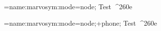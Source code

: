 \documentclass{article}
\begin{document}
\font\test={name:marvosym:mode=node;}
Test {\test ^^^^260e}

\font\test={name:marvosym:mode=node;+phone;}
Test {\test ^^^^260e}
\end{document}
